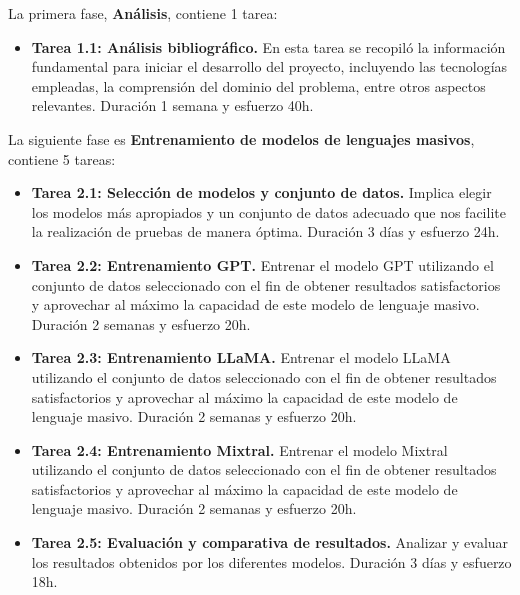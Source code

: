 La primera fase, \textbf{Análisis}, contiene 1 tarea:
\begin{itemize}
    \item \textbf{Tarea 1.1: Análisis bibliográfico.} En esta tarea se recopiló la información fundamental para iniciar el desarrollo del proyecto, incluyendo las tecnologías empleadas, la comprensión del dominio del problema, entre otros aspectos relevantes. Duración 1 semana y esfuerzo 40h.
\end{itemize}

La siguiente fase es \textbf{Entrenamiento de modelos de lenguajes masivos}, contiene 5 tareas:
\begin{itemize}
    \item \textbf{Tarea 2.1: Selección de modelos y conjunto de datos.} Implica elegir los modelos más apropiados y un conjunto de datos adecuado que nos facilite la realización de pruebas de manera óptima. Duración 3 días y esfuerzo 24h.
    \item \textbf{Tarea 2.2: Entrenamiento \acrshort{GPT}.} Entrenar el modelo \acrshort{GPT} utilizando el conjunto de datos seleccionado con el fin de obtener resultados satisfactorios y aprovechar al máximo la capacidad de este modelo de lenguaje masivo.
    Duración 2 semanas y esfuerzo 20h.
    \item \textbf{Tarea 2.3: Entrenamiento \acrshort{LLaMA}.} Entrenar el modelo \acrshort{LLaMA} utilizando el conjunto de datos seleccionado con el fin de obtener resultados satisfactorios y aprovechar al máximo la capacidad de este modelo de lenguaje masivo.
    Duración 2 semanas y esfuerzo 20h.
    \item \textbf{Tarea 2.4: Entrenamiento Mixtral.} Entrenar el modelo Mixtral utilizando el conjunto de datos seleccionado con el fin de obtener resultados satisfactorios y aprovechar al máximo la capacidad de este modelo de lenguaje masivo.
    Duración 2 semanas y esfuerzo 20h.
    \item \textbf{Tarea 2.5: Evaluación y comparativa de resultados.} Analizar y evaluar los resultados obtenidos por los diferentes modelos.
    Duración 3 días y esfuerzo 18h.
\end{itemize}

